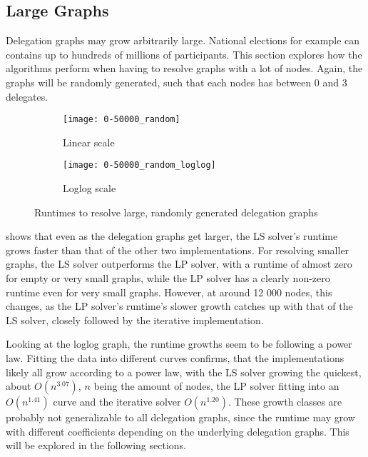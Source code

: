 \subsection{Large Graphs}

Delegation graphs may grow arbitrarily large. National elections for example can contains up to hundreds of millions of participants. This section explores how the algorithms perform when having to resolve graphs with a lot of nodes. Again, the graphs will be randomly generated, such that each nodes has between 0 and 3 delegates. 

\begin{figure}[t]

\end{figure}

\begin{figure}[t]
    \centering
    \begin{subfigure}[t]{0.45\textwidth}
    	\centering
    	\texttt{[image: 0-50000\_random]}
    	\caption{Linear scale}
    	\label{fig:random-large-linear}
    \end{subfigure}
    \hfill
    \begin{subfigure}[t]{0.45\textwidth}
        \centering
        \texttt{[image: 0-50000\_random\_loglog]}
        \caption{Loglog scale}
         \label{subfig:random-large-loglog}
    \end{subfigure}
    \caption{Runtimes to resolve large, randomly generated delegation graphs}
    \label{fig:random-large}
\end{figure}

 shows that even as the delegation graphs get larger, the LS solver's runtime grows faster than that of the other two implementations. For resolving smaller graphs, the LS solver outperforms the LP solver, with a runtime of almost zero for empty or very small graphs, while the LP solver has a clearly non-zero runtime even for very small graphs. However, at around 12 000 nodes, this changes, as the LP solver's runtime's slower growth catches up with that of the LS solver, closely followed by the iterative implementation. 

Looking at the loglog graph, the runtime growths seem to be following a power law. Fitting the data into different curves confirms, that the implementations likely all grow according to a power law, with the LS solver growing the quickest, about $O(n^{3.07})$, $n$ being the amount of nodes, the LP solver fitting into an $O(n^{1.41})$ curve and the iterative solver $O(n^{1.20})$. These growth classes are probably not generalizable to all delegation graphs, since the runtime may grow with different coefficients depending on the underlying delegation graphs. This will be explored in the following sections.


